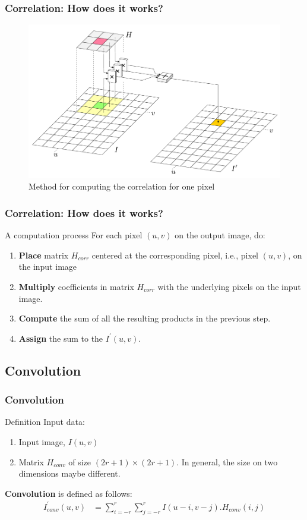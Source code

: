 \documentclass[english,11pt,table,handout]{beamer}
\begin{document}
\frame
{
	\frametitle{Correlation: How does it works?}
	\begin{figure}[!h]
		\includegraphics[scale=0.57]{correlation.png}
		\caption{Method for computing the correlation for one pixel}
	\end{figure}
}

\frame
{
	\frametitle{Correlation: How does it works?}
	\begin{block}{A computation process}
		For each pixel $(u,v)$ on the output image, do:
		\begin{enumerate}
			\item \textbf{Place} matrix $H_{corr}$ centered at the corresponding pixel, i.e., pixel $(u,v)$, on the input image
			\item \textbf{Multiply} coefficients in matrix $H_{corr}$ with the underlying pixels on the input image.
			\item \textbf{Compute} the sum of all the resulting products in the previous step.
			\item \textbf{Assign} the sum to the $I^{'}(u,v)$.
		\end{enumerate}
	
	\end{block}
}


\subsection{Convolution}
\frame
{
	\frametitle{Convolution}
		
	\begin{block}{Definition}
		Input data:
		\begin{enumerate}
			\item Input image, $I(u,v)$
			\item Matrix $H_{conv}$ of size $(2r+1) \times (2r+1)$. In general, the size on two dimensions maybe different.
		\end{enumerate}
		\textbf{Convolution} is defined as follows:
		\begin{equation*} 
		\begin{split}
		I_{conv}^{'}{(u,v)} &= \sum_{i=-r}^{r}{\sum_{j=-r}^{r}{I(u-i, v-j).H_{conv}{(i,j)}}}
		\end{split}
		\end{equation*}
	\end{block}
}
\end{document}
